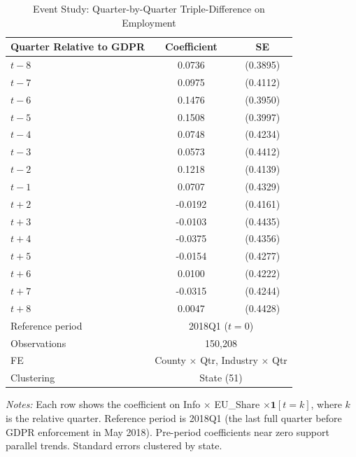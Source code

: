 \begin{table}[t]
\centering
\begin{threeparttable}
\caption{Event Study: Quarter-by-Quarter Triple-Difference on Employment}
\label{tab:event_study}
\small
\begin{tabular}{lcc}
\toprule
Quarter Relative to GDPR & Coefficient & SE \\
\midrule
$t-8$ & 0.0736 & (0.3895) \\
$t-7$ & 0.0975 & (0.4112) \\
$t-6$ & 0.1476 & (0.3950) \\
$t-5$ & 0.1508 & (0.3997) \\
$t-4$ & 0.0748 & (0.4234) \\
$t-3$ & 0.0573 & (0.4412) \\
$t-2$ & 0.1218 & (0.4139) \\
$t-1$ & 0.0707 & (0.4329) \\
$t+2$ & -0.0192 & (0.4161) \\
$t+3$ & -0.0103 & (0.4435) \\
$t+4$ & -0.0375 & (0.4356) \\
$t+5$ & -0.0154 & (0.4277) \\
$t+6$ & 0.0100 & (0.4222) \\
$t+7$ & -0.0315 & (0.4244) \\
$t+8$ & 0.0047 & (0.4428) \\
\midrule
Reference period & \multicolumn{2}{c}{2018Q1 ($t = 0$)} \\
Observations & \multicolumn{2}{c}{150,208} \\
FE & \multicolumn{2}{c}{County $\times$ Qtr, Industry $\times$ Qtr} \\
Clustering & \multicolumn{2}{c}{State (51)} \\
\bottomrule
\end{tabular}
\begin{tablenotes}[flushleft]\small
\item \textit{Notes:} Each row shows the coefficient on Info $\times$ EU\_Share $\times \mathbf{1}[t = k]$, where $k$ is the relative quarter. Reference period is 2018Q1 (the last full quarter before GDPR enforcement in May 2018). Pre-period coefficients near zero support parallel trends. Standard errors clustered by state.
\end{tablenotes}
\end{threeparttable}
\end{table}
